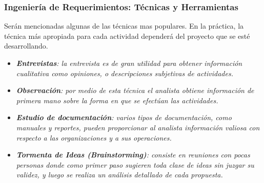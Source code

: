 \documentclass[11pt,oneside]{book}
\begin{document}
\subsubsection{Ingeniería de Requerimientos: Técnicas y Herramientas}
Serán mencionadas algunas de las técnicas mas populares. En la práctica, la técnica más apropiada para cada actividad dependerá del proyecto que se esté desarrollando.
\begin{itemize}
\item \textit{\textbf{Entrevistas}: la entrevista es de gran utilidad para obtener información cualitativa como opiniones, o descripciones subjetivas de actividades.} 

\item \textit{\textbf{Observación}: por medio de esta técnica el analista obtiene información de primera mano sobre la forma en que se efectúan las actividades.}

\item \textit{\textbf{Estudio de documentación}: varios tipos de documentación, como manuales y reportes, pueden proporcionar al analista información valiosa con respecto a las organizaciones y a sus operaciones.} 

\item \textit{\textbf{Tormenta de Ideas (Brainstorming)}: consiste en reuniones con pocas personas donde como primer paso sugieren toda clase de ideas sin juzgar su validez, y luego se realiza un análisis detallado de cada propuesta.} 
\end{itemize}
\end{document}
